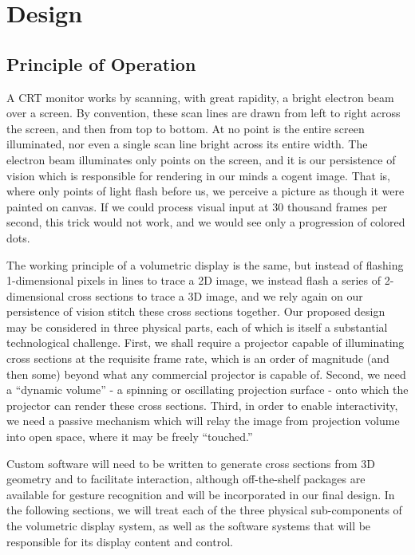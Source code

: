 \documentclass[12pt]{article}
\begin{document}
\section{Design}
\subsection{Principle of Operation}
A CRT monitor works by scanning, with great rapidity, a bright electron beam over a screen. By convention, these scan lines are drawn from left to right across the screen, and then from top to bottom. At no point is the entire screen illuminated, nor even a single scan line bright across its entire width. The electron beam illuminates only points on the screen, and it is our persistence of vision which is responsible for rendering in our minds a cogent image. That is, where only points of light flash before us, we perceive a picture as though it were painted on canvas. If we could process visual input at 30 thousand frames per second, this trick would not work, and we would see only a progression of colored dots.

The working principle of a volumetric display is the same, but instead of flashing 1-dimensional pixels in lines to trace a 2D image, we instead flash a series of 2-dimensional cross sections to trace a 3D image, and we rely again on our persistence of vision stitch these cross sections together. Our proposed design may be considered in three physical parts, each of which is itself a substantial technological challenge. First, we shall require a projector capable of illuminating cross sections at the requisite frame rate, which is an order of magnitude (and then some) beyond what any commercial projector is capable of. Second, we need a “dynamic volume” - a spinning or oscillating projection surface - onto which the projector can render these cross sections. Third, in order to enable interactivity, we need a passive mechanism which will relay the image from projection volume into open space, where it may be freely “touched.”

Custom software will need to be written to generate cross sections from 3D geometry and to facilitate interaction, although off-the-shelf packages are available for gesture recognition and will be incorporated in our final design. In the following sections, we will treat each of the three physical sub-components of the volumetric display system, as well as the software systems that will be responsible for its display content and control.
\end{document}
